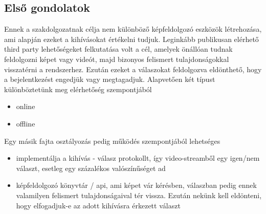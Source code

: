 \subsection{Első gondolatok}
Ennek a szakdolgozatnak célja nem különböző képfeldolgozó eszközök létrehozása, ami alapján ezeket a kihívásokat értékelni tudjuk. Leginkább publikusan elérhető third party lehetőségeket felkutatása volt a cél, amelyek önállóan tudnak feldolgozni képet vagy videót, majd bizonyos felismert tulajdonságokkal visszatérni a rendszerhez. Ezután ezeket a válaszokat feldolgozva eldönthető, hogy a bejelentkezést engedjük vagy megtagadjuk.
Alapvetően két típust különböztetünk meg elérhetőség szempontjából
\begin{itemize}
\item online
\item offline
\end{itemize}
Egy másik fajta osztályozás pedig működés szempontjából lehetséges
\begin{itemize}
\item implementálja a kihívás - válasz protokollt, így video-streamből egy igen/nem választ, esetleg egy százalékos valószínűséget ad
\item képfeldolgozó könyvtár / api, ami képet vár kérésben, válaszban pedig ennek valamilyen felismert tulajdonságaival tér vissza. Ezután nekünk kell eldönteni, hogy elfogadjuk-e az adott kihívásra érkezett választ
\end{itemize}

